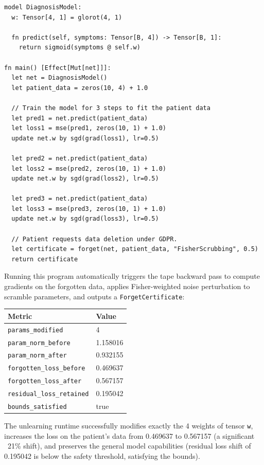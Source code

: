 \documentclass[11pt,a4paper]{article}
\begin{document}
\begin{lstlisting}
model DiagnosisModel:
  w: Tensor[4, 1] = glorot(4, 1)

  fn predict(self, symptoms: Tensor[B, 4]) -> Tensor[B, 1]:
    return sigmoid(symptoms @ self.w)

fn main() [Effect[Mut[net]]]:
  let net = DiagnosisModel()
  let patient_data = zeros(10, 4) + 1.0

  // Train the model for 3 steps to fit the patient data
  let pred1 = net.predict(patient_data)
  let loss1 = mse(pred1, zeros(10, 1) + 1.0)
  update net.w by sgd(grad(loss1), lr=0.5)

  let pred2 = net.predict(patient_data)
  let loss2 = mse(pred2, zeros(10, 1) + 1.0)
  update net.w by sgd(grad(loss2), lr=0.5)

  let pred3 = net.predict(patient_data)
  let loss3 = mse(pred3, zeros(10, 1) + 1.0)
  update net.w by sgd(grad(loss3), lr=0.5)

  // Patient requests data deletion under GDPR.
  let certificate = forget(net, patient_data, "FisherScrubbing", 0.5)
  return certificate
\end{lstlisting}

Running this program automatically triggers the tape backward pass to compute gradients on the forgotten data, applies Fisher-weighted noise perturbation to scramble parameters, and outputs a \texttt{ForgetCertificate}:

\begin{center}
\begin{tabular}{ll}
\toprule
\textbf{Metric} & \textbf{Value} \\
\midrule
\texttt{params\_modified} & 4 \\
\texttt{param\_norm\_before} & 1.158016 \\
\texttt{param\_norm\_after} & 0.932155 \\
\texttt{forgotten\_loss\_before} & 0.469637 \\
\texttt{forgotten\_loss\_after} & 0.567157 \\
\texttt{residual\_loss\_retained} & 0.195042 \\
\texttt{bounds\_satisfied} & true \\
\bottomrule
\end{tabular}
\end{center}

The unlearning runtime successfully modifies exactly the 4 weights of tensor \texttt{w}, increases the loss on the patient's data from 0.469637 to 0.567157 (a significant ~21\% shift), and preserves the general model capabilities (residual loss shift of 0.195042 is below the safety threshold, satisfying the bounds).
\end{document}
